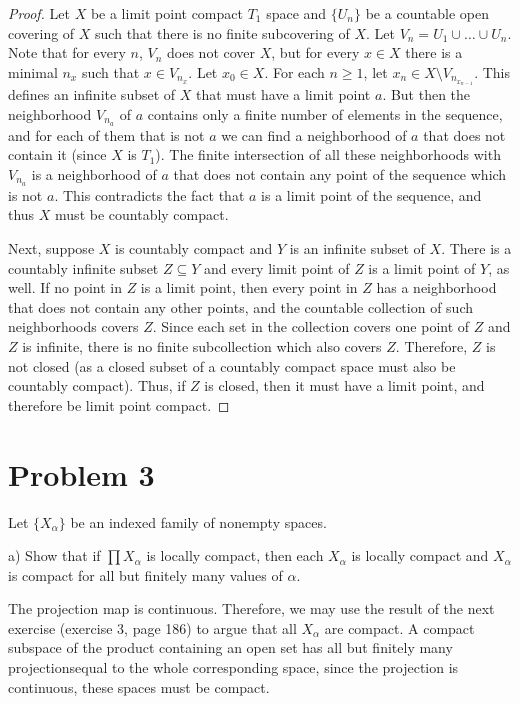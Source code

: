 \documentclass[11pt]{article}
\begin{document}
\begin{proof}
Let \(X\) be a limit point compact \(T_1\) space and \(\{U_n\}\) be a countable open
covering of \(X\) such that there is no finite subcovering of \(X\). Let \(V_n =
U_1\cup\ldots\cup U_n\). Note that for every \(n\), \(V_n\) does not cover \(X\), but
for every \(x\in X\) there is a minimal \(n_x\) such that \(x \in V_{n_x}\). Let
\(x_0\in X\). For each \(n\geq 1\), let \(x_n\in X\setminus V_{n_{x_{n-1}}}\). This
defines an infinite subset of \(X\) that must have a limit point \(a\). But then the
neighborhood \(V_{n_a}\) of \(a\) contains only a finite number of elements in the
sequence, and for each of them that is not \(a\) we can find a neighborhood of \(a\)
that does not contain it (since \(X\) is \(T_1\)). The finite intersection of all
these neighborhoods with \(V_{n_a}\) is a neighborhood of \(a\) that does not
contain any point of the sequence which is not \(a\). This contradicts the fact
that \(a\) is a limit point of the sequence, and thus \(X\) must be countably
compact.

Next, suppose \(X\) is countably compact and \(Y\) is an infinite subset of \(X\).
There is a countably infinite subset \(Z\subseteq Y\) and every limit point of \(Z\)
is a limit point of \(Y\), as well. If no point in \(Z\) is a limit point, then
every point in \(Z\) has a neighborhood that does not contain any other points,
and the countable collection of such neighborhoods covers \(Z\). Since each set in
the collection covers one point of \(Z\) and \(Z\) is infinite, there is no finite
subcollection which also covers \(Z\). Therefore, \(Z\) is not closed (as a closed
subset of a countably compact space must also be countably compact). Thus, if
\(Z\) is closed, then it must have a limit point, and therefore be limit point
compact. 
\end{proof}
\section{Problem 3}
\label{sec:org70164db}
Let \(\{X_{\alpha}\}\) be an indexed family of nonempty spaces. 

a) Show that if \(\prod X_{\alpha}\) is locally compact, then each \(X_{\alpha}\) is
locally compact and \(X_{\alpha}\) is compact for all but finitely many values of
\(\alpha\). 

The projection map is continuous. Therefore, we may use the result of the next
exercise (exercise 3, page 186) to argue that all \(X_{\alpha}\) are compact. A
compact subspace of the product containing an open set has all but finitely many
projectionsequal to the whole corresponding space, since the projection is
continuous, these spaces must be compact. 
\end{document}
